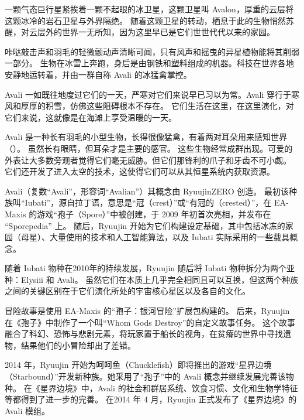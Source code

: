 
一颗气态巨行星紧挨着一颗不起眼的冰卫星，这颗卫星叫 Avalon，厚重的云层将这颗冰冷的岩石卫星与外界隔绝。
随着这颗卫星的转动，栖息于此的生物悄然苏醒，对云层外的世界一无所知，因为这里早已是它们世世代代以来的家园。

咔哒敲击声和羽毛的轻微颤动声清晰可闻，只有风声和摇曳的异星植物能将其削弱一部分。
生物在冰雪上奔跑，身后是由钢铁和塑料组成的机器。科技在世界各地安静地运转着，并由一群自称 Avali 的冰猛禽掌控。

Avali 一如既往地度过它们的一天，严寒对它们来说早已习以为常。Avali 穿行于寒风和厚厚的积雪，仿佛这些阻碍根本不存在。
它们生活在这里，在这里演化，对它们来说，这就像是在海滩上享受温暖的一天。

Avali 是一种长有羽毛的小型生物，长得很像猛禽，有着两对耳朵用来感知世界（）。
虽然长有眼睛，但耳朵才是主要的感官。
这些生物经常成群出现。可爱的外表让大多数旁观者觉得它们毫无威胁。但它们那锋利的爪子和牙齿不可小觑。
它们还开发了进入太空的技术，这使得它们可以从其恒星系统内获取资源。


Avali（复数“Avali”，形容词“Avalian”）其概念由 RyuujinZERO 创造。
最初该种族叫“Iubati”，源自拉丁语，意思是“冠（crest）”或“有冠的（crested）”，在 EA-Maxis 的游戏“孢子（Spore）”中被创建，于 2009 年初首次亮相，并发布在 “Sporepedia” 上。
随后，Ryuujin 开始为它们构建设定基础，其中包括冰冻的家园（母星）、大量使用的技术和人工智能算法，以及 Iubati 实际采用的一些载具概念。

随着 Iubati 物种在2010年的持续发展，Ryuujin 随后将 Iubati 物种拆分为两个亚种：Elysiii 和 Avali。
虽然它们在本质上几乎完全相同且可以互换，但这两个种族之间的关键区别在于它们演化所处的宇宙核心星区以及各自的文化。

冒险故事是使用 EA-Maxis 的“孢子：银河冒险”扩展包构建的。
后来，Ryuujin 在《孢子》中制作了一个叫“Whom Gods Destroy”的自定义故事任务。
这个故事融合了科幻、恐怖与悲剧元素，将玩家置于船长的视角，在贫瘠的世界中寻找遗物，结果他们的小冒险却出了差错。

2014 年，Ryuujin 开始为呵呵鱼（Chucklefish）即将推出的游戏“星界边境（Starbound）”开发新种族。她采用了“孢子”中的 Avali 概念并继续发展完善该物种。
在《星界边境》中，Avali 的社会和群居系统、饮食习惯、文化和生物学特征等都得到了进一步的完善。
在2014 年 4 月，Ryuujin 正式发布了《星界边境》的 Avali 模组。


